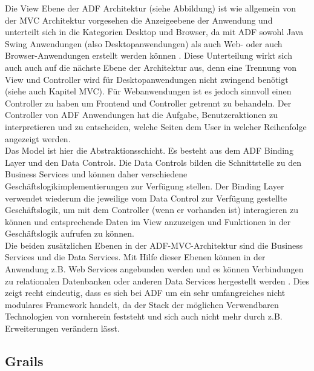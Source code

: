 Die View Ebene der ADF Architektur (siehe Abbildung) ist wie allgemein von der MVC Architektur vorgesehen die Anzeigeebene der Anwendung und unterteilt sich in die Kategorien Desktop und Browser, da mit ADF sowohl Java Swing Anwendungen (also Desktopanwendungen) als auch Web- oder auch Browser-Anwendungen erstellt werden können \citep[S.22]{AUW2009}. Diese Unterteilung wirkt sich auch auch auf die nächste Ebene der Architektur aus, denn eine Trennung von View und Controller wird für Desktopanwendungen nicht zwingend benötigt (siehe auch Kapitel MVC). Für Webanwendungen ist es jedoch sinnvoll einen Controller zu haben um Frontend und Controller getrennt zu behandeln. Der Controller von ADF Anwendungen hat die Aufgabe, Benutzeraktionen zu interpretieren und zu entscheiden, welche Seiten dem User in welcher Reihenfolge angezeigt werden\citep[S.12]{OAEAD2014}.\\
Das Model ist hier die Abstraktionsschicht. Es besteht aus dem ADF Binding Layer und den Data Controls. Die Data Controls bilden die Schnittstelle zu den Business Services und können daher verschiedene Geschäftslogikimplementierungen zur Verfügung stellen. Der Binding Layer verwendet wiederum die jeweilige vom Data Control zur Verfügung gestellte Geschäftslogik, um mit dem Controller (wenn er vorhanden ist) interagieren zu können und entsprechende Daten im View anzuzeigen und Funktionen in der Geschäftslogik aufrufen zu können. \citep[S.6]{ARIA2015}\\
Die beiden zusätzlichen Ebenen in der ADF-MVC-Architektur sind die Business Services und die Data Services. Mit Hilfe dieser Ebenen können in der Anwendung z.B. Web Services angebunden werden und es können Verbindungen zu relationalen Datenbanken oder anderen Data Services hergestellt werden \citep[S.13]{OAEAD2014}. Dies zeigt recht eindeutig, dass es sich bei ADF um ein sehr umfangreiches nicht modulares Framework handelt, da der Stack der möglichen Verwendbaren Technologien von vornherein feststeht und sich auch nicht mehr durch z.B. Erweiterungen verändern lässt.

\subsection{Grails}
